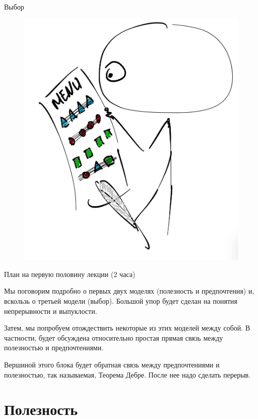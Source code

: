 \documentclass{beamer}
\begin{document}
\begin{frame}{Выбор}

\begin{figure}[hbt]
\centering
\includegraphics[width=.7 \textwidth]{pic3}
\end{figure}

\end{frame}

\begin{frame}{План на первую половину лекции (2 часа)}

Мы поговорим подробно о первых двух моделях (полезность и предпочтения) и, вскользь о третьей модели (выбор). Большой упор будет сделан на понятия непрерывности и выпуклости.

Затем, мы попробуем отождествить некоторые из этих моделей между собой. В частности, будет обсуждена относительно простая прямая связь между полезностью и предпочтениями.

Вершиной этого блока будет обратная связь между предпочтениями и полезностью, так называемая, Теорема Дебре. После нее надо сделать перерыв.

\end{frame}

\section{Полезность}
\end{document}
